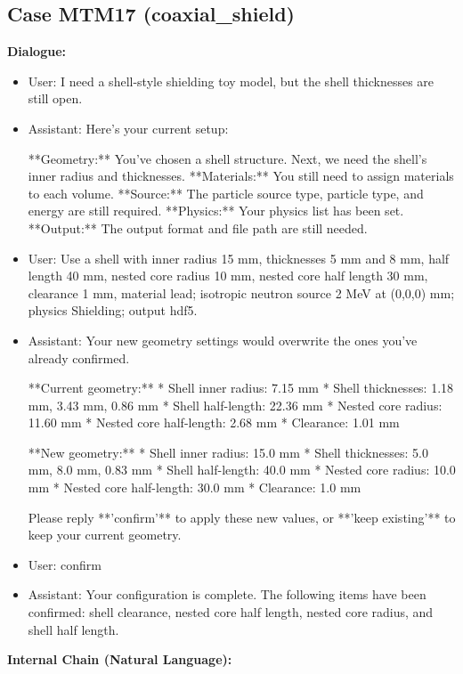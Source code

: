 \documentclass[11pt]{ctexart}
\begin{document}
\subsection{Case MTM17 (coaxial\_shield)}
\textbf{Dialogue:}
\begin{itemize}
\item User: I need a shell-style shielding toy model, but the shell thicknesses are still open.
\item Assistant: Here's your current setup:

**Geometry:** You've chosen a shell structure. Next, we need the shell's inner radius and thicknesses.
**Materials:** You still need to assign materials to each volume.
**Source:** The particle source type, particle type, and energy are still required.
**Physics:** Your physics list has been set.
**Output:** The output format and file path are still needed.
\item User: Use a shell with inner radius 15 mm, thicknesses 5 mm and 8 mm, half length 40 mm, nested core radius 10 mm, nested core half length 30 mm, clearance 1 mm, material lead; isotropic neutron source 2 MeV at (0,0,0) mm; physics Shielding; output hdf5.
\item Assistant: Your new geometry settings would overwrite the ones you've already confirmed.

**Current geometry:**
*   Shell inner radius: 7.15 mm
*   Shell thicknesses: 1.18 mm, 3.43 mm, 0.86 mm
*   Shell half-length: 22.36 mm
*   Nested core radius: 11.60 mm
*   Nested core half-length: 2.68 mm
*   Clearance: 1.01 mm

**New geometry:**
*   Shell inner radius: 15.0 mm
*   Shell thicknesses: 5.0 mm, 8.0 mm, 0.83 mm
*   Shell half-length: 40.0 mm
*   Nested core radius: 10.0 mm
*   Nested core half-length: 30.0 mm
*   Clearance: 1.0 mm

Please reply **'confirm'** to apply these new values, or **'keep existing'** to keep your current geometry.
\item User: confirm
\item Assistant: Your configuration is complete. The following items have been confirmed: shell clearance, nested core half length, nested core radius, and shell half length.
\end{itemize}
\textbf{Internal Chain (Natural Language):}
\end{document}
